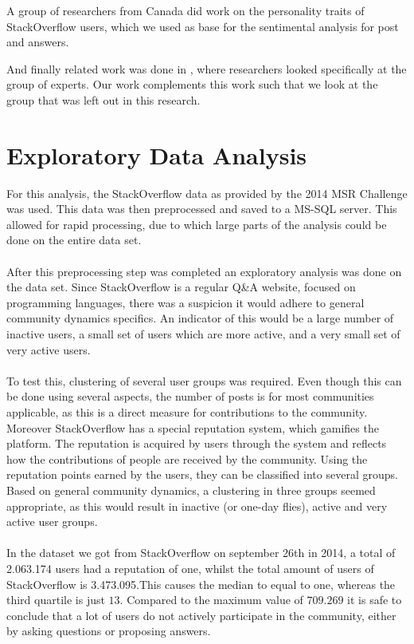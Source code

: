 \documentclass[conference]{IEEEtran}
\begin{document}
A group of researchers from Canada \cite{PersonalityTraits} did work on the personality traits of StackOverflow users, which we used as base for the sentimental analysis for post and answers.

And finally related work was done in \cite{sparrowsandowls}, where researchers looked specifically at the group of experts. Our work complements this work such that we look at the group that was left out in this research.
\\



\section{Exploratory Data Analysis}

For this analysis, the StackOverflow data as provided by the 2014 MSR Challenge was used. This data was then preprocessed and saved to a MS-SQL server. This allowed for rapid processing, due to which large parts of the analysis could be done on the entire data set.
\\
\\
After this preprocessing step was completed an exploratory analysis was done on the data set. Since StackOverflow is a regular Q\&A website, focused on programming languages, there was a suspicion it would adhere to general community dynamics specifics. An indicator of this would be a large number of inactive users, a small set of users which are more active, and a very small set of very active users.
\\
\\
To test this, clustering of several user groups was required. Even though  this can be done using several aspects, the number of posts is for most communities applicable, as this is a direct measure for contributions to the community. Moreover StackOverflow has a special reputation system, which gamifies the platform. The reputation is acquired by users through the system and reflects how the contributions of people are received by the community. Using the reputation points earned by the users, they can be classified into several groups. Based  on general community dynamics, a clustering in three groups seemed appropriate, as this would result in inactive (or one-day flies), active and very active user groups.
\\
\\
In the dataset we got from StackOverflow on september 26th in 2014, a total of 2.063.174 users had a reputation of one, whilst the total amount of users of StackOverflow is 3.473.095.This causes the median to  equal to one, whereas the third quartile is just $13$. Compared to the maximum value of $709.269$ it is safe to conclude that a lot of users do not actively participate in the community, either by asking questions or proposing answers.
\end{document}
